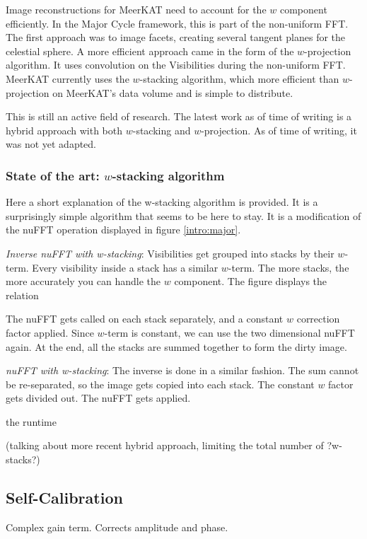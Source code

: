 Image reconstructions for MeerKAT need to account for the $w$ component efficiently. In the Major Cycle framework, this is part of the non-uniform FFT. The first approach was to image facets, creating several tangent planes for the celestial sphere. A more efficient approach came in the form of the $w$-projection algorithm\cite{cornwell2008noncoplanar}. It uses convolution on the Visibilities during the non-uniform FFT. MeerKAT currently uses the $w$-stacking algorithm, which more efficient than $w$-projection on MeerKAT's data volume and is simple to distribute.


This is still an active field of research. The latest work as of time of writing is a hybrid approach\cite{pratley2018fast} with both $w$-stacking and $w$-projection. As of time of writing, it was not yet adapted.


\subsubsection{State of the art: $w$-stacking algorithm}
Here a short explanation of the w-stacking algorithm is provided. It is a surprisingly simple algorithm that seems to be here to stay. It is a modification of the nuFFT operation displayed in figure \ref{intro:major}. 


\textit{Inverse nuFFT with w-stacking}:
Visibilities get grouped into stacks by their $w$-term. Every visibility inside a stack has a similar $w$-term. The more stacks, the more accurately you can handle the $w$ component. The figure displays the relation

The nuFFT gets called on each stack separately, and a constant $w$ correction factor applied. Since $w$-term is constant, we can use the two dimensional nuFFT again. At the end, all the stacks are summed together to form the dirty image. 

\textit{nuFFT with w-stacking}:
The inverse is done in a similar fashion. The sum cannot be re-separated, so the image gets copied into each stack. The constant $w$ factor gets divided out. The nuFFT gets applied.

the runtime

(talking about more recent hybrid approach, limiting the total number of ?w-stacks?)



\subsection{Self-Calibration}
Complex gain term. Corrects amplitude and phase. 

